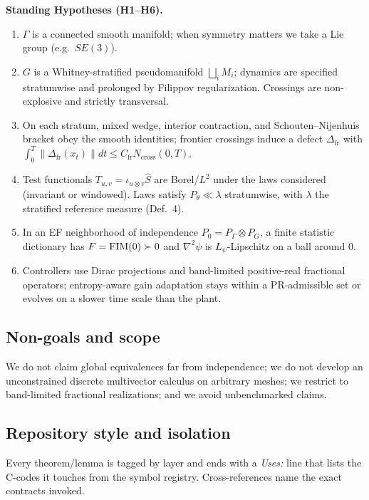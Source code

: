 \begin{mdframed}
\textbf{Standing Hypotheses (H1--H6).}
\begin{enumerate}[label=(H\arabic*),leftmargin=*]
\item $\Gamma$ is a connected smooth manifold; when symmetry matters we take a Lie group (e.g.\ $SE(3)$).
\item $G$ is a Whitney-stratified pseudomanifold $\bigsqcup_i M_i$; dynamics are specified stratumwise and prolonged by Filippov regularization. Crossings are non-explosive and strictly transversal.
\item On each stratum, mixed wedge, interior contraction, and Schouten--Nijenhuis bracket obey the smooth identities; frontier crossings induce a defect $\Delta_{\mathrm{fr}}$ with $\int_0^T\|\Delta_{\mathrm{fr}}(x_t)\|dt\le C_{\mathrm{fr}} N_{\mathrm{cross}}(0,T)$.
\item Test functionals $T_{u,v}=\iota_{u\otimes v}\hat S$ are Borel/$L^2$ under the laws considered (invariant or windowed). Laws satisfy $P_\theta\ll\lambda$ stratumwise, with $\lambda$ the stratified reference measure (Def.~4).
\item In an EF neighborhood of independence $P_0=P_\Gamma\otimes P_G$, a finite statistic dictionary has $F=\mathrm{FIM}(0)\succ0$ and $\nabla^2\psi$ is $L_\psi$-Lipschitz on a ball around $0$.
\item Controllers use Dirac projections and band-limited positive-real fractional operators; entropy-aware gain adaptation stays within a PR-admissible set or evolves on a slower time scale than the plant.
\end{enumerate}
\end{mdframed}

\subsection*{Non-goals and scope}
We do not claim global equivalences far from independence; we do not develop an unconstrained discrete multivector calculus on arbitrary meshes; we restrict to band-limited fractional realizations; and we avoid unbenchmarked claims.

\subsection*{Repository style and isolation}
Every theorem/lemma is tagged by layer and ends with a \emph{Uses:} line that lists the C-codes it touches from the symbol registry. Cross-references name the exact contracts invoked.

